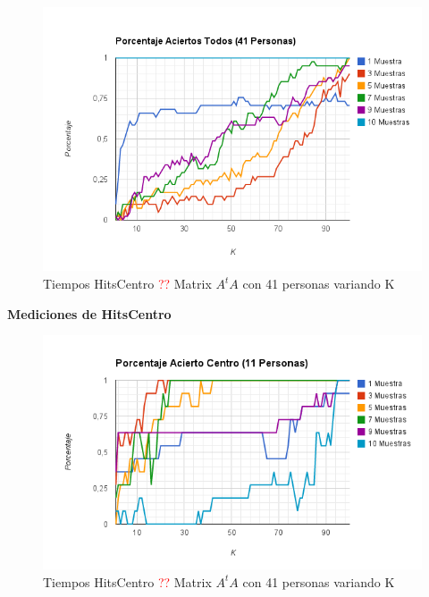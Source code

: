 \begin{figure}[H]
\includegraphics[width=1\textwidth]{img/imagef12.png}
     \caption{Tiempos HitsCentro \textcolor{red}{??} Matrix $A^tA$ con 41 personas variando K}
     \label{fig:figura1}
\end{figure}

\textbf{Mediciones de HitsCentro }

\begin{figure}[H]
\includegraphics[width=1\textwidth]{img/imagef13.png}
     \caption{Tiempos HitsCentro \textcolor{red}{??} Matrix $A^tA$ con 41 personas variando K}
     \label{fig:figura1}
\end{figure}

